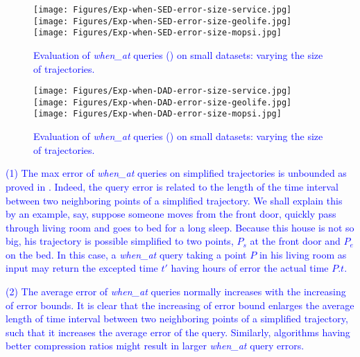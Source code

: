 {\begin{figure*}[tb!]
	\centering
	\texttt{[image: Figures/Exp-when-SED-error-size-service.jpg]} 	\hspace{0.5ex}
	\texttt{[image: Figures/Exp-when-SED-error-size-geolife.jpg]}	\hspace{0.5ex}
	\texttt{[image: Figures/Exp-when-SED-error-size-mopsi.jpg]}		
	\vspace{-2ex}
	\caption{\small \textcolor{blue}{Evaluation of \emph{when\_at} queries (\sed) on small datasets: varying the size of
		trajectories.}}
	\label{fig:query-when-sed-size}
	\vspace{-1ex}
\end{figure*}


\begin{figure*}[tb!]
	\centering
	\texttt{[image: Figures/Exp-when-DAD-error-size-service.jpg]}	\hspace{0.5ex}
	\texttt{[image: Figures/Exp-when-DAD-error-size-geolife.jpg]}	\hspace{0.5ex}
	\texttt{[image: Figures/Exp-when-DAD-error-size-mopsi.jpg]}	
	\vspace{-2ex}
	\caption{\small \textcolor{blue}{Evaluation of \emph{when\_at} queries (\dad) on small datasets: varying the size of trajectories.}}
	\label{fig:query-when-dad-size}
	\vspace{-1ex}
\end{figure*}

\ni \textcolor{blue}{(1) The max error of \emph{when\_at} queries on simplified trajectories is unbounded as proved in \cite{Cao:Spatio}. Indeed, the query error is related to the length of the time interval between two neighboring points of a simplified trajectory. We shall explain this by an example, say, suppose someone moves from the front door, quickly pass through living room and goes to bed for a long sleep. Because this house is not so big, his trajectory is possible simplified to two points, \ie $P_s$ at the front door and $P_e$ on the bed. In this case, a \emph{when\_at} query taking a point $P$ in his living room as input may return the excepted time $t'$ having hours of error \wrt the actual time $P.t$.}

\ni \textcolor{blue}{(2) The average error of \emph{when\_at} queries normally increases with the increasing of error bounds. It is clear that the increasing of error bound enlarges the average length of time interval between two neighboring points of a simplified trajectory, such that it increases the average error of the query. Similarly, algorithms having better compression ratios might result in larger \emph{when\_at} query errors.}
	
}
